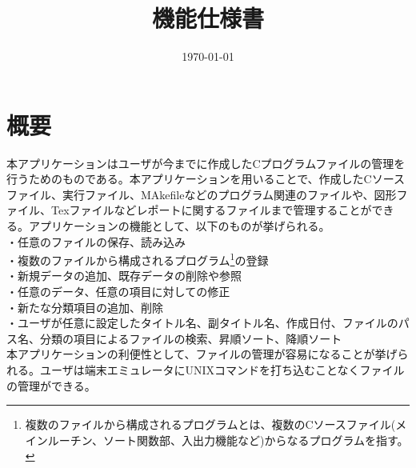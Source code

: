 \documentclass[a4j]{jarticle}
\title{機能仕様書}
\date{\today}
\begin{document}
\maketitle

\tableofcontents

\newpage

\section{概要}
本アプリケーションはユーザが今までに作成したCプログラムファイルの管理を行うためのものである。本アプリケーションを用いることで、作成したCソースファイル、実行ファイル、MAkefileなどのプログラム関連のファイルや、図形ファイル、Texファイルなどレポートに関するファイルまで管理することができる。アプリケーションの機能として、以下のものが挙げられる。\\
・任意のファイルの保存、読み込み\\
・複数のファイルから構成されるプログラム\footnote{複数のファイルから構成されるプログラムとは、複数のCソースファイル(メインルーチン、ソート関数部、入出力機能など)からなるプログラムを指す。}の登録\\
・新規データの追加、既存データの削除や参照\\
・任意のデータ、任意の項目に対しての修正\\
・新たな分類項目の追加、削除\\
・ユーザが任意に設定したタイトル名、副タイトル名、作成日付、ファイルのパス名、分類の項目によるファイルの検索、昇順ソート、降順ソート\\

本アプリケーションの利便性として、ファイルの管理が容易になることが挙げられる。ユーザは端末エミュレータにUNIXコマンドを打ち込むことなくファイルの管理ができる。

\newpage
\end{document}
